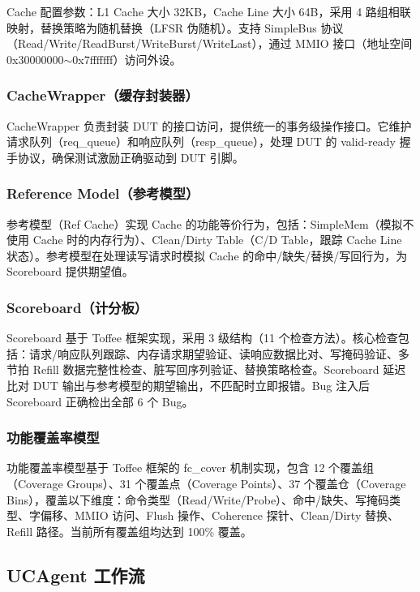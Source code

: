 \documentclass[12pt,a4paper]{ctexart}
\begin{document}
Cache 配置参数：L1 Cache 大小 32KB，Cache Line 大小 64B，采用 4 路组相联映射，替换策略为随机替换（LFSR 伪随机）。支持 SimpleBus 协议（Read/Write/ReadBurst/WriteBurst/WriteLast），通过 MMIO 接口（地址空间 0x30000000$\sim$0x7fffffff）访问外设。

\subsubsection{CacheWrapper（缓存封装器）}

CacheWrapper 负责封装 DUT 的接口访问，提供统一的事务级操作接口。它维护请求队列（req\_queue）和响应队列（resp\_queue），处理 DUT 的 valid-ready 握手协议，确保测试激励正确驱动到 DUT 引脚。

\subsubsection{Reference Model（参考模型）}

参考模型（Ref Cache）实现 Cache 的功能等价行为，包括：SimpleMem（模拟不使用 Cache 时的内存行为）、Clean/Dirty Table（C/D Table，跟踪 Cache Line 状态）。参考模型在处理读写请求时模拟 Cache 的命中/缺失/替换/写回行为，为 Scoreboard 提供期望值。

\subsubsection{Scoreboard（计分板）}

Scoreboard 基于 Toffee 框架实现，采用 3 级结构（11 个检查方法）。核心检查包括：请求/响应队列跟踪、内存请求期望验证、读响应数据比对、写掩码验证、多节拍 Refill 数据完整性检查、脏写回序列验证、替换策略检查。Scoreboard 延迟比对 DUT 输出与参考模型的期望输出，不匹配时立即报错。Bug 注入后 Scoreboard 正确检出全部 6 个 Bug。

\subsubsection{功能覆盖率模型}

功能覆盖率模型基于 Toffee 框架的 fc\_cover 机制实现，包含 12 个覆盖组（Coverage Groups）、31 个覆盖点（Coverage Points）、37 个覆盖仓（Coverage Bins），覆盖以下维度：命令类型（Read/Write/Probe）、命中/缺失、写掩码类型、字偏移、MMIO 访问、Flush 操作、Coherence 探针、Clean/Dirty 替换、Refill 路径。当前所有覆盖组均达到 100\% 覆盖。

\subsection{UCAgent 工作流}
\end{document}

